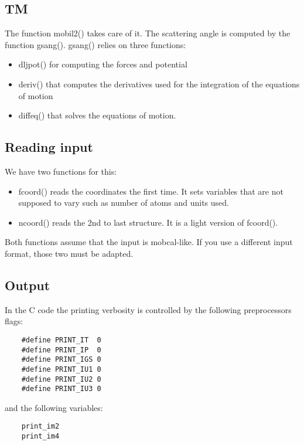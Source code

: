 \documentclass[letter,12pt]{article}
\begin{document}
\subsection{TM}
The function mobil2() takes care of it. The scattering angle is computed by the function gsang().
gsang() relies on three functions:
\begin{itemize}
    \item dljpot() for computing the forces and potential
    \item deriv() that computes the derivatives used for the integration of the equations of motion
    \item diffeq() that solves the equations of motion.
\end{itemize}

\subsection{Reading input}
We have two functions for this:
\begin{itemize}
    \item fcoord() reads the coordinates the first time. It sets variables that are not supposed to vary such as number of atoms and units used.
    \item ncoord() reads the 2nd to last structure. It is a light version of fcoord().
\end{itemize}
Both functions assume that the input is mobcal-like. If you use a different input format, those two must be adapted.

\subsection{Output}
In the C code the printing verbosity is controlled by the following preprocessors flags:
\begin{verbatim}    
    #define PRINT_IT  0
    #define PRINT_IP  0
    #define PRINT_IGS 0
    #define PRINT_IU1 0
    #define PRINT_IU2 0
    #define PRINT_IU3 0
\end{verbatim}

and the following variables:
\begin{verbatim}
    print_im2
    print_im4
\end{verbatim}
\end{document}
